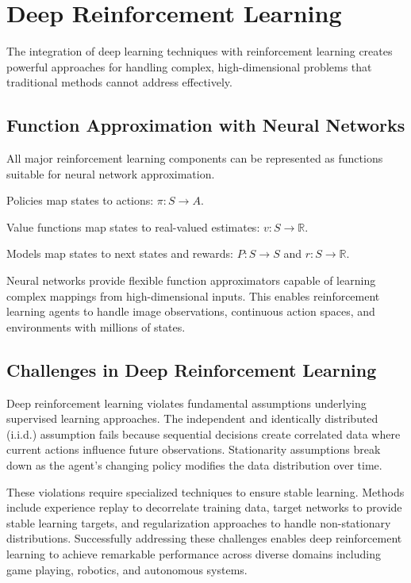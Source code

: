 \section{Deep Reinforcement Learning}


    The integration of deep learning techniques with reinforcement learning creates powerful approaches for handling complex, high-dimensional problems that traditional methods cannot address effectively.


\subsection{Function Approximation with Neural Networks}

    All major reinforcement learning components can be represented as functions suitable for neural network approximation.
    \begin{compactitemize}
        \item Policies map states to actions: $\pi: S \rightarrow A$. 
        \item Value functions map states to real-valued estimates: $v: S \rightarrow \mathbb{R}$. 
        \item Models map states to next states and rewards: $P: S \rightarrow S$ and $r: S \rightarrow \mathbb{R}$.    
    \end{compactitemize}
    Neural networks provide flexible function approximators capable of learning complex mappings from high-dimensional inputs. This enables reinforcement learning agents to handle image observations, continuous action spaces, and environments with millions of states.


\subsection{Challenges in Deep Reinforcement Learning}

    Deep reinforcement learning violates fundamental assumptions underlying supervised learning approaches. The independent and identically distributed (i.i.d.) assumption fails because sequential decisions create correlated data where current actions influence future observations. Stationarity assumptions break down as the agent's changing policy modifies the data distribution over time.
    
    These violations require specialized techniques to ensure stable learning. Methods include experience replay to decorrelate training data, target networks to provide stable learning targets, and regularization approaches to handle non-stationary distributions. Successfully addressing these challenges enables deep reinforcement learning to achieve remarkable performance across diverse domains including game playing, robotics, and autonomous systems.
